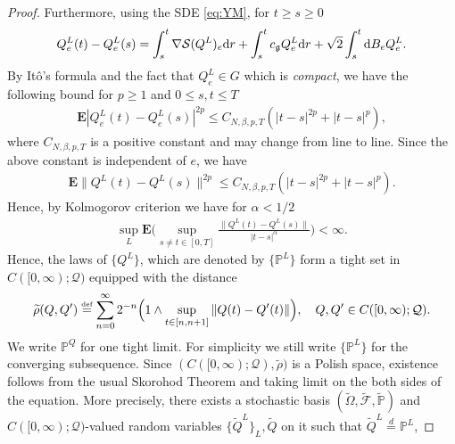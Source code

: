 \documentclass[11pt,UTF-8,reqno]{amsart}
\numberwithin{equation}{section}
\def\dif{{\mathord{{\rm d}}}}
\newcommand{\eqdef}{\stackrel{\mbox{\tiny def}}{=}}
\def\cF{{\mathcal F}}
\def\cL{{\mathcal L}}
\def\cQ{{\mathcal Q}}
\def\cS{{\mathcal S}}
\def\mP{{\mathbb P}}
\def\sF{{\mathscr F}}
\def\E{\mathbf E}
\def\geq{\geqslant}
\def\leq{\leqslant}
\def\E{\mathbf{E}}
\def\dif{{\mathord{{\rm d}}}}
\def\mfg{\mathfrak{g}}
\def\geq{\geqslant}
\def\leq{\leqslant}
\begin{document}
\begin{proof}
 Furthermore,  using the SDE \eqref{eq:YM}, for $t\geq s\geq0$
\begin{align*}
	Q_e^L(t)-Q_e^L(s)=\int_s^t\nabla \cS(Q^L)_e\dif r+\int_s^tc_{\mfg}Q_e^L\dif r+\sqrt2\int_s^t\dif B_eQ_e^L.
\end{align*}
By It\^o's formula and the fact that
$Q_e^L\in G$ which is {\it compact}, we have the following bound for $p\geq 1$ and $0\leq s,t\leq T$
\begin{align*}
	\E|Q_e^L(t)-Q_e^L(s)|^{2p}\leq C_{N,\beta,p,T}(|t-s|^{2p}+|t-s|^p),
\end{align*}
where $C_{N,\beta,p,T}$ is a positive constant and may change from line to line.
Since the above constant is independent of $e$, we have
\begin{align*}
	\E\|Q^L(t)-Q^L(s)\|^{2p}\leq C_{N,\beta,p,T}(|t-s|^{2p}+|t-s|^p).
\end{align*}
Hence, by Kolmogorov criterion we have for $\alpha<1/2$
\begin{align*}
	\sup_L\E\Big(\sup_{s\neq t\in [0,T]}\frac{\|Q^L(t)-Q^L(s)\|}{|t-s|^\alpha}\Big)<\infty.
\end{align*}
Hence, the laws  of $\{Q^L\}$, which are denoted by $\{\mP^L\}$ form a tight set in $C([0,\infty);\cQ)$ equipped with the distance
\begin{align*}
	\widetilde\rho(Q,Q')\eqdef \sum_{n=0}^\infty 2^{-n}\Big(1\wedge \sup_{t\in [n,n+1]}\|Q(t)-Q'(t)\|\Big), \quad Q,Q'\in C([0,\infty);\cQ).
\end{align*}
We write  $\mP^Q$ for one tight limit. For simplicity we still write  $\{\mP^L\}$ for the converging subsequence.
Since $(C([0,\infty);\cQ), 	\widetilde\rho)$ is a Polish space, existence follows from the usual Skorohod Theorem and
taking limit on the both sides of the equation.
More precisely, there exists a stochastic basis $(\tilde \Omega,\tilde\sF,\tilde \mP)$ and $C([0,\infty);\cQ)$-valued random variables $\{\tilde Q^L\}_L, \tilde Q$ on it such that $\tilde Q^L \stackrel{d}{=} \mP^L$, 

\end{proof}
\end{document}

